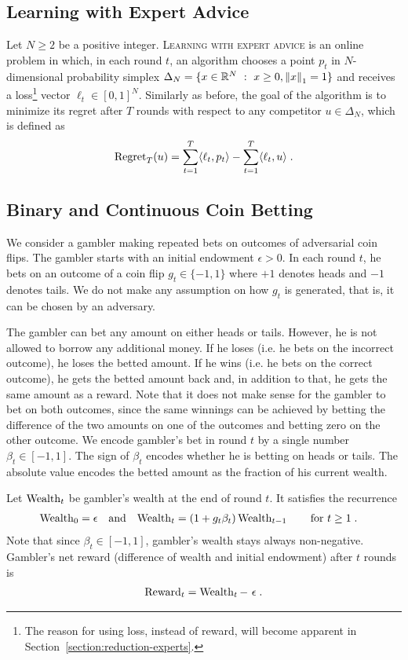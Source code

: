 \subsection{Learning with Expert Advice}

Let $N \ge 2$ be a positive integer. \textsc{Learning with expert advice} is an
online problem in which, in each round $t$, an algorithm chooses a point $p_t$
in $N$-dimensional probability simplex $\Delta_N = \{ x \in \mathbb{R}^N ~:~ x \ge 0,
\left\|{x}\right\|_1 = 1 \}$ and receives a loss\footnote{The reason for using loss,
instead of reward, will become apparent in
Section~\ref{section:reduction-experts}.} vector $\ell_t \in [0,1]^N$. Similarly
as before, the goal of the algorithm is to minimize its regret after $T$ rounds
with respect to any competitor $u \in \Delta_N$, which is defined as
$$
\operatorname{Regret}_T(u) = \sum_{t=1}^T \langle \ell_t, p_t \rangle - \sum_{t=1}^T \langle \ell_t, u \rangle \; .
$$

\subsection{Binary and Continuous Coin Betting}

We consider a gambler making repeated bets on outcomes of adversarial coin
flips. The gambler starts with an initial endowment $\epsilon > 0$. In each
round $t$, he bets on an outcome of a coin flip $g_t \in \{-1,1\}$ where $+1$
denotes heads and $-1$ denotes tails. We do not make any assumption on how $g_t$
is generated, that is, it can be chosen by an adversary.

The gambler can bet any amount on either heads or tails. However, he is not
allowed to borrow any additional money. If he loses (i.e. he bets on the
incorrect outcome), he loses the betted amount. If he wins (i.e. he bets on the
correct outcome), he gets the betted amount back and, in addition to that, he
gets the same amount as a reward. Note that it does not make sense for the
gambler to bet on both outcomes, since the same winnings can be achieved by
betting the difference of the two amounts on one of the outcomes and betting
zero on the other outcome. We encode gambler's bet in round $t$ by a single
number $\beta_t \in [-1,1]$. The sign of $\beta_t$ encodes whether he is betting
on heads or tails. The absolute value encodes the betted amount as the fraction
of his current wealth.

Let $\operatorname{Wealth}_t$ be gambler's wealth at the end of round $t$. It satisfies the
recurrence
\begin{align}
\label{equation:wealth-recurrence}
\operatorname{Wealth}_0 & = \epsilon &
& \text{and} &
\operatorname{Wealth}_t & = (1 + g_t \beta_t) \operatorname{Wealth}_{t-1} \qquad \text{for $t \ge 1$} \; .
\end{align}
Note that since $\beta_t \in [-1,1]$, gambler's wealth stays always non-negative.
Gambler's net reward (difference of wealth and initial endowment) after $t$
rounds is
\begin{align}
\label{equation:reward-wealth}
\operatorname{Reward}_t = \operatorname{Wealth}_t - \ \epsilon \; .
\end{align}

